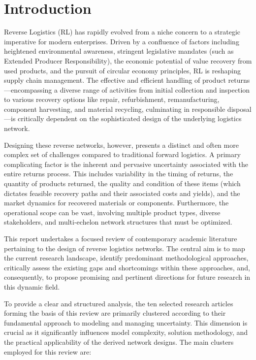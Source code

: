 \section{Introduction}

Reverse Logistics (RL) has rapidly evolved from a niche concern to a strategic imperative for modern enterprises. Driven by a confluence of factors including heightened environmental awareness, stringent legislative mandates (such as Extended Producer Responsibility), the economic potential of value recovery from used products, and the pursuit of circular economy principles, RL is reshaping supply chain management. The effective and efficient handling of product returns—encompassing a diverse range of activities from initial collection and inspection to various recovery options like repair, refurbishment, remanufacturing, component harvesting, and material recycling, culminating in responsible disposal—is critically dependent on the sophisticated design of the underlying logistics network.

Designing these reverse networks, however, presents a distinct and often more complex set of challenges compared to traditional forward logistics. A primary complicating factor is the inherent and pervasive uncertainty associated with the entire returns process. This includes variability in the timing of returns, the quantity of products returned, the quality and condition of these items (which dictates feasible recovery paths and their associated costs and yields), and the market dynamics for recovered materials or components. Furthermore, the operational scope can be vast, involving multiple product types, diverse stakeholders, and multi-echelon network structures that must be optimized.

This report undertakes a focused review of contemporary academic literature pertaining to the design of reverse logistics networks. The central aim is to map the current research landscape, identify predominant methodological approaches, critically assess the existing gaps and shortcomings within these approaches, and, consequently, to propose promising and pertinent directions for future research in this dynamic field.

To provide a clear and structured analysis, the ten selected research articles forming the basis of this review are primarily clustered according to their fundamental approach to modeling and managing uncertainty. This dimension is crucial as it significantly influences model complexity, solution methodology, and the practical applicability of the derived network designs. The main clusters employed for this review are:

